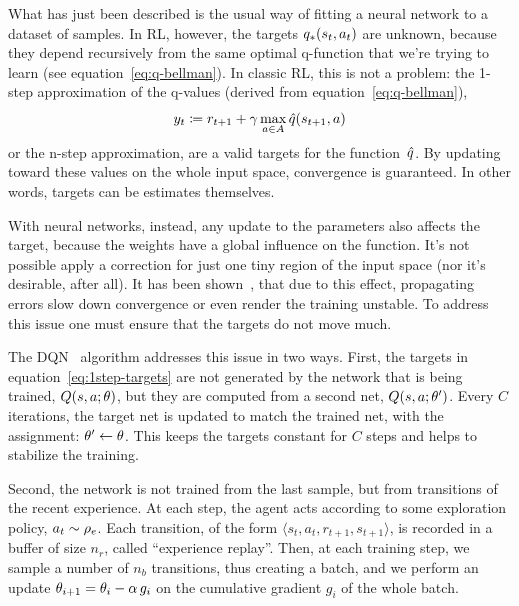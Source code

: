 What has just been described is the usual way of fitting a neural network
to a dataset of samples. In RL, however, the targets ${q}_*(s_t, a_t)$
are unknown, because they depend recursively from the same optimal q-function
that we're trying to learn (see equation~\eqref{eq:q-bellman}). In classic RL,
this is not a problem: the 1-step approximation of the q-values (derived from
equation~\eqref{eq:q-bellman}),
\begin{equation}
	y_t \coloneqq r_{t+1} + \gamma \max_{a \in A} \hat{q}(s_{t+1}, a)
	\label{eq:1step-targets}
\end{equation}
or the n-step approximation, are a valid targets for the function~$\hat{q}$.
By updating toward these values on the whole input space, convergence is
guaranteed. In other words, targets can be estimates themselves.

With neural networks, instead, any update to the parameters also affects the
target, because the weights have a global influence on the function. It's not
possible apply a correction for just one tiny region of the input space (nor
it's desirable, after all).  It has been shown~\cite{bib:nfq}, that due to
this effect, propagating errors slow down convergence or even render the
training unstable.  To address this issue one must ensure that the targets do
not move much.

The DQN~\cite{bib:atari-deeprl} algorithm addresses this issue in two ways.
First, the targets in equation~\eqref{eq:1step-targets} are not generated by
the network that is being trained, $Q(s, a; \theta)$, but they are computed
from a second net, $Q(s, a; \theta')$. Every $C$ iterations, the target net
is updated to match the trained net, with the assignment: $\theta' \gets
\theta$. This keeps the targets constant for $C$ steps and helps to stabilize
the training.

Second, the network is not trained from the last sample, but from transitions
of the recent experience. At each step, the agent acts according to some
exploration policy, $a_t \sim \rho_e$. Each transition, of the form
$\langle s_t, a_t, r_{t+1}, s_{t+1} \rangle$, is recorded in a buffer of size
$n_r$, called ``experience replay''. Then, at each training step, we sample a
number of $n_b$ transitions, thus creating a batch, and we perform an update
$\theta_{i+1} = \theta_i - \alpha\, g_i$ on the cumulative gradient $g_i$ of
the whole batch.

